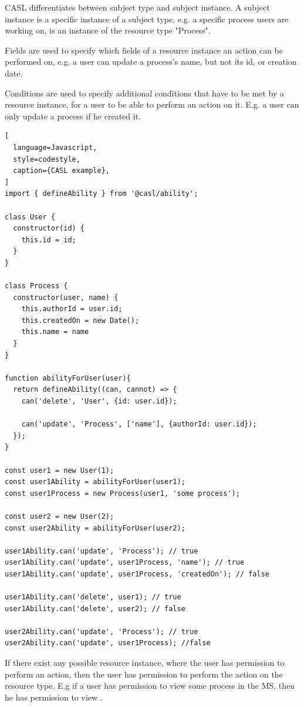 CASL differentiates between subject type and subject instance. 
A subject instance is a specific instance of a subject type, e.g. a specific process
users are working on, is an instance of the resource type "Process". 

Fields are used to specify which fields of a resource instance an action can be performed
on, e.g. a user can update a process's name, but not its id, or creation date.

Conditions are used to specify additional conditions that have to be met by a resource
instance, for a user to be able to perform an action on it. E.g. a user can only update a
process if he created it.

\begin{lstlisting}[
  language=Javascript,
  style=codestyle,
  caption={CASL example},
]
import { defineAbility } from '@casl/ability';

class User {
  constructor(id) {
    this.id = id;
  }
}

class Process {
  constructor(user, name) {
    this.authorId = user.id;
    this.createdOn = new Date();
    this.name = name
  }
}

function abilityForUser(user){
  return defineAbility((can, cannot) => {
    can('delete', 'User', {id: user.id});

    can('update', 'Process', ['name'], {authorId: user.id});
  });
}

const user1 = new User(1);
const user1Ability = abilityForUser(user1);
const user1Process = new Process(user1, 'some process');

const user2 = new User(2);
const user2Ability = abilityForUser(user2);

user1Ability.can('update', 'Process'); // true
user1Ability.can('update', user1Process, 'name'); // true
user1Ability.can('update', user1Process, 'createdOn'); // false

user1Ability.can('delete', user1); // true
user1Ability.can('delete', user2); // false

user2Ability.can('update', 'Process'); // true
user2Ability.can('update', user1Process); //false
\end{lstlisting}

If there exist any possible resource instance, where the user has permission to perform an action,
then the user has permission to perform the action on the resource type.
E.g if a user has permission to view some process in the MS, then he has permission to view .
